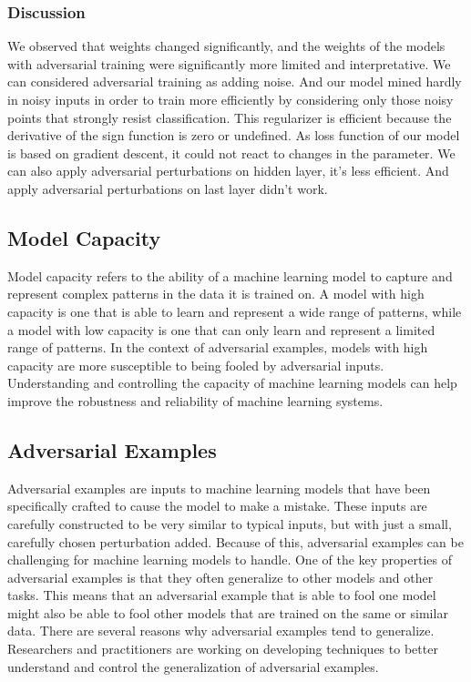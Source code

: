 \subsubsection{Discussion}
We observed that weights changed significantly, and the weights of the models with adversarial training were significantly more limited and interpretative. We can considered adversarial training as adding noise. And our model mined hardly in noisy inputs in order to train more efficiently by considering only those noisy points that strongly resist classification. This regularizer is efficient because the derivative of the sign function is zero or undefined. As loss function of our model is based on gradient descent, it could not react to changes in the parameter. We can also apply adversarial perturbations on hidden layer, it's less efficient. And apply adversarial perturbations on last layer didn't work. 

\subsection{Model Capacity}
Model capacity refers to the ability of a machine learning model to capture and represent complex patterns in the data it is trained on. A model with high capacity is one that is able to learn and represent a wide range of patterns, while a model with low capacity is one that can only learn and represent a limited range of patterns. In the context of adversarial examples, models with high capacity are more susceptible to being fooled by adversarial inputs. Understanding and controlling the capacity of machine learning models can help improve the robustness and reliability of machine learning systems.

\subsection{Adversarial Examples}
Adversarial examples are inputs to machine learning models that have been specifically crafted to cause the model to make a mistake. These inputs are carefully constructed to be very similar to typical inputs, but with just a small, carefully chosen perturbation added. Because of this, adversarial examples can be challenging for machine learning models to handle. One of the key properties of adversarial examples is that they often generalize to other models and other tasks. This means that an adversarial example that is able to fool one model might also be able to fool other models that are trained on the same or similar data. There are several reasons why adversarial examples tend to generalize. Researchers and practitioners are working on developing techniques to better understand and control the generalization of adversarial examples.

